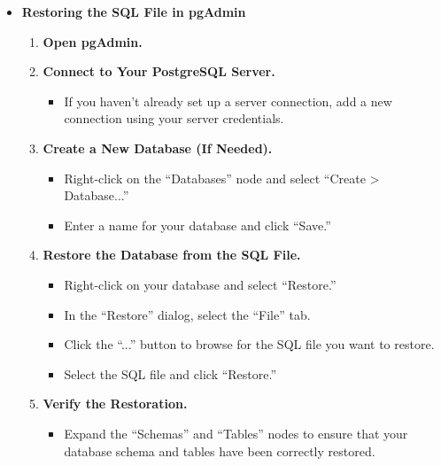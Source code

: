 \begin{itemize}
    \item \textbf{Restoring the SQL File in pgAdmin}
    \begin{enumerate}[label=\textbf{Step \arabic*:}]
        \item \textbf{Open pgAdmin.}
        \item \textbf{Connect to Your PostgreSQL Server.}
        \begin{itemize}
            \item If you haven’t already set up a server connection, add a new connection using your server credentials.
        \end{itemize}
        \item \textbf{Create a New Database (If Needed).}
        \begin{itemize}
            \item Right-click on the “Databases” node and select “Create > Database...”
            \item Enter a name for your database and click “Save.”
        \end{itemize}
        \item \textbf{Restore the Database from the SQL File.}
        \begin{itemize}
            \item Right-click on your database and select “Restore.”
            \item In the “Restore” dialog, select the “File” tab.
            \item Click the “...” button to browse for the SQL file you want to restore.
            \item Select the SQL file and click “Restore.”
        \end{itemize}
        \item \textbf{Verify the Restoration.}
        \begin{itemize}
            \item Expand the “Schemas” and “Tables” nodes to ensure that your database schema and tables have been correctly restored.
        \end{itemize}
    \end{enumerate}
    

\end{itemize}
